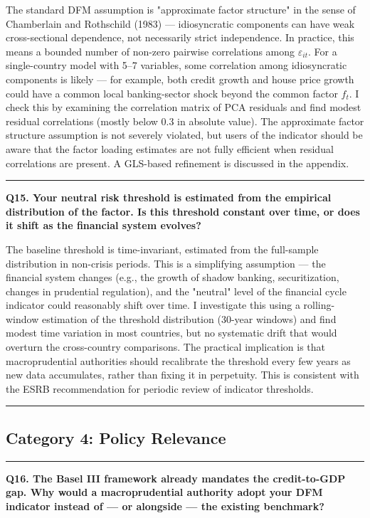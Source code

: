 \documentclass[11pt,a4paper]{article}
\begin{document}
The standard DFM assumption is "approximate factor structure" in the sense of Chamberlain and Rothschild (1983) — idiosyncratic components can have weak cross-sectional dependence, not necessarily strict independence. In practice, this means a bounded number of non-zero pairwise correlations among $\varepsilon_{it}$. For a single-country model with 5–7 variables, some correlation among idiosyncratic components is likely — for example, both credit growth and house price growth could have a common local banking-sector shock beyond the common factor $f_t$. I check this by examining the correlation matrix of PCA residuals and find modest residual correlations (mostly below 0.3 in absolute value). The approximate factor structure assumption is not severely violated, but users of the indicator should be aware that the factor loading estimates are not fully efficient when residual correlations are present. A GLS-based refinement is discussed in the appendix.

\medskip\hrule\medskip

\textbf{Q15. Your neutral risk threshold is estimated from the empirical distribution of the factor. Is this threshold constant over time, or does it shift as the financial system evolves?}

The baseline threshold is time-invariant, estimated from the full-sample distribution in non-crisis periods. This is a simplifying assumption — the financial system changes (e.g., the growth of shadow banking, securitization, changes in prudential regulation), and the "neutral" level of the financial cycle indicator could reasonably shift over time. I investigate this using a rolling-window estimation of the threshold distribution (30-year windows) and find modest time variation in most countries, but no systematic drift that would overturn the cross-country comparisons. The practical implication is that macroprudential authorities should recalibrate the threshold every few years as new data accumulates, rather than fixing it in perpetuity. This is consistent with the ESRB recommendation for periodic review of indicator thresholds.

\medskip\hrule\medskip

\subsection*{Category 4: Policy Relevance}

\medskip\hrule\medskip

\textbf{Q16. The Basel III framework already mandates the credit-to-GDP gap. Why would a macroprudential authority adopt your DFM indicator instead of — or alongside — the existing benchmark?}
\end{document}
